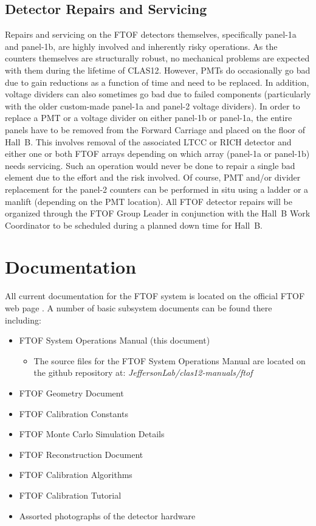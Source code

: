 \documentclass[12pt]{article}
\begin{document}
\subsection{Detector Repairs and Servicing}

Repairs and servicing on the FTOF detectors themselves, specifically panel-1a and 
panel-1b, are highly involved and inherently risky operations. As the counters 
themselves are structurally robust, no mechanical problems are expected with them 
during the lifetime of CLAS12. However, PMTs do occasionally go bad due to gain 
reductions as a function of time and need to be replaced. In addition, voltage 
dividers can also sometimes go bad due to failed components (particularly with the 
older custom-made panel-1a and panel-2 voltage dividers). In order to replace a PMT 
or a voltage divider on either panel-1b or panel-1a, the entire panels have to be 
removed from the Forward Carriage and placed on the floor of Hall~B. This involves 
removal of the associated LTCC or RICH detector and either one or both FTOF arrays 
depending on which array (panel-1a or panel-1b) needs servicing. Such an operation would
never be done to repair a single bad element due to the effort and the risk involved. Of
course, PMT and/or divider replacement for the panel-2 counters can be performed in situ
using a ladder or a manlift (depending on the PMT location). All FTOF detector repairs
will be organized through the FTOF Group Leader in conjunction with the Hall~B Work
Coordinator to be scheduled during a planned down time for Hall~B.

\clearpage

\vfil
\eject

\section{Documentation}

All current documentation for the FTOF system is located on the official FTOF web page
\cite{ftof-web}. A number of basic subsystem documents can be found there including:

\begin{itemize}
\item FTOF System Operations Manual (this document)
 \begin{itemize}
   \item The source files for the FTOF System Operations Manual are located on the
         github repository at: {\it JeffersonLab/clas12-manuals/ftof}
 \end{itemize}
\item FTOF Geometry Document
\item FTOF Calibration Constants
\item FTOF Monte Carlo Simulation Details
\item FTOF Reconstruction Document
\item FTOF Calibration Algorithms
\item FTOF Calibration Tutorial
\item Assorted photographs of the detector hardware
\end{itemize}
\end{document}
